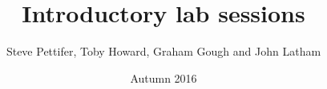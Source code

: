 \title{Introductory lab sessions}
\date{Autumn 2016}
\author{Steve Pettifer, Toby Howard, Graham Gough and John Latham}




\dominitoc
 





\setcounter{chapter}{-1}
\renewcommand{\chaptername}{Welcome Lab Session}

\renewcommand{\chaptername}{Intro Lab Session}






\printbibliography

